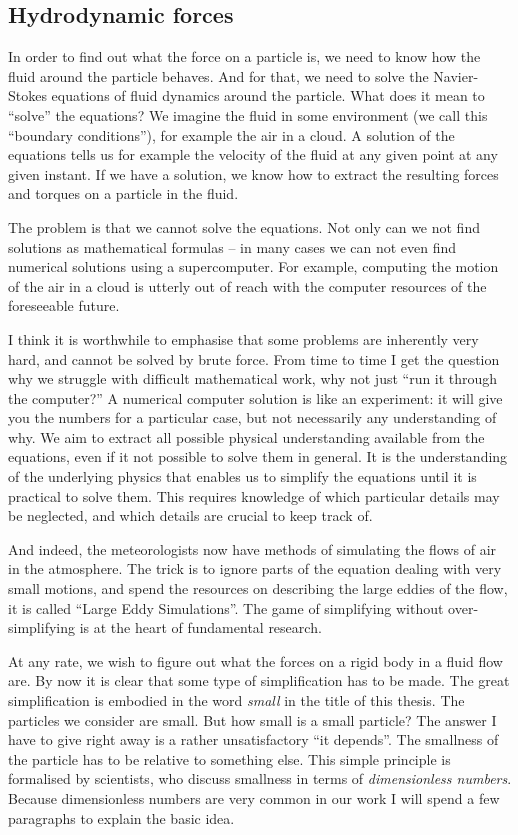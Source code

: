 \documentclass[thesis.tex]{subfiles}
\begin{document}
\subsection*{Hydrodynamic forces}

In order to find out what the force on a particle is, we need to know how the fluid around the particle behaves. And for that, we need to solve the Navier-Stokes equations of fluid dynamics around the particle. What does it mean to ``solve'' the equations? We imagine the fluid in some environment (we call this ``boundary conditions''), for example the air in a cloud. A solution of the equations tells us for example the velocity of the fluid at any given point at any given instant. If we have a solution, we know how to extract the resulting forces and torques on a particle in the fluid.

The problem is that we cannot solve the equations. Not only can we not find solutions as mathematical formulas -- in many cases we can not even find numerical solutions using a supercomputer. For example, computing the motion of the air in a cloud is utterly out of reach with the computer resources of the foreseeable future.

I think it is worthwhile to emphasise that some problems are inherently very hard, and cannot be solved by brute force. From time to time I get the question why we struggle with difficult mathematical work, why not just ``run it through the computer?'' A numerical computer solution is like an experiment: it will give you the numbers for a particular case, but not necessarily any understanding of why. We aim to extract all possible physical understanding available from the equations, even if it not possible to solve them in general. It is the understanding of the underlying physics that enables us to simplify the equations until it is practical to solve them. This requires knowledge of which particular details may be neglected, and which details are crucial to keep track of. 

And indeed, the meteorologists now have methods of simulating the flows of air in the atmosphere. The trick is to ignore parts of the equation dealing with very small motions, and spend the resources on describing the large eddies of the flow, it is called ``Large Eddy Simulations''. The game of simplifying without over-simplifying is at the heart of fundamental research.

At any rate, we wish to figure out what the forces on a rigid body in a fluid flow are. By now it is clear that some type of simplification has to be made. The great simplification is embodied in the word \emph{small} in the title of this thesis. The particles we consider are small. But how small is a small particle? The answer I have to give right away is a rather unsatisfactory ``it depends''. The smallness of the particle has to be relative to something else. This simple principle is formalised by scientists, who discuss smallness in terms of \emph{dimensionless numbers}. Because dimensionless numbers are very common in our work I will spend a few paragraphs to explain the basic idea.
\end{document}
